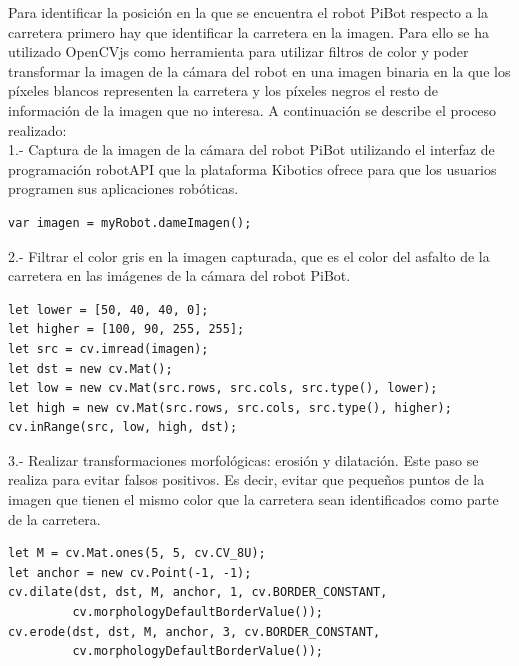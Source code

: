 \documentclass{report}
\begin{document}
Para identificar la posición en la que se encuentra el robot PiBot respecto a la carretera primero hay que identificar la carretera en la imagen. Para ello se ha utilizado OpenCVjs como herramienta para utilizar filtros de color y poder transformar la imagen de la cámara del robot en una imagen binaria en la que los píxeles blancos representen la carretera y los píxeles negros el resto de información de la imagen que no interesa. A continuación se describe el proceso realizado:
\\

1.- Captura de la imagen de la cámara del robot PiBot utilizando el interfaz de programación robotAPI que la plataforma Kibotics ofrece para que los usuarios programen sus aplicaciones robóticas.

\begin{lstlisting}[backgroundcolor = \color{light-gray},
				   aboveskip = 1em,
				   belowskip = 2em,
                   xleftmargin = 2cm,
                   framexleftmargin = 1em,
                   basicstyle=\small]
var imagen = myRobot.dameImagen();
\end{lstlisting}

2.- Filtrar el color gris en la imagen capturada, que es el color del asfalto de la carretera en las imágenes de la cámara del robot PiBot.

\begin{lstlisting}[backgroundcolor = \color{light-gray},
				   aboveskip = 1em,
				   belowskip = 2em,
                   xleftmargin = 2cm,
                   framexleftmargin = 1em,
                   basicstyle=\small]
let lower = [50, 40, 40, 0];
let higher = [100, 90, 255, 255];
let src = cv.imread(imagen);
let dst = new cv.Mat();
let low = new cv.Mat(src.rows, src.cols, src.type(), lower);
let high = new cv.Mat(src.rows, src.cols, src.type(), higher);
cv.inRange(src, low, high, dst);
\end{lstlisting}

3.- Realizar transformaciones morfológicas: erosión y dilatación. Este paso se realiza para evitar falsos positivos. Es decir, evitar que pequeños puntos de la imagen que tienen el mismo color que la carretera sean identificados como parte de la carretera.

\begin{lstlisting}[backgroundcolor = \color{light-gray},
				   aboveskip = 1em,
				   belowskip = 2em,
                   xleftmargin = 2cm,
                   framexleftmargin = 1em,
                   basicstyle=\small]
let M = cv.Mat.ones(5, 5, cv.CV_8U);
let anchor = new cv.Point(-1, -1);
cv.dilate(dst, dst, M, anchor, 1, cv.BORDER_CONSTANT,
		 cv.morphologyDefaultBorderValue());
cv.erode(dst, dst, M, anchor, 3, cv.BORDER_CONSTANT,
		 cv.morphologyDefaultBorderValue());
\end{lstlisting}
\end{document}
